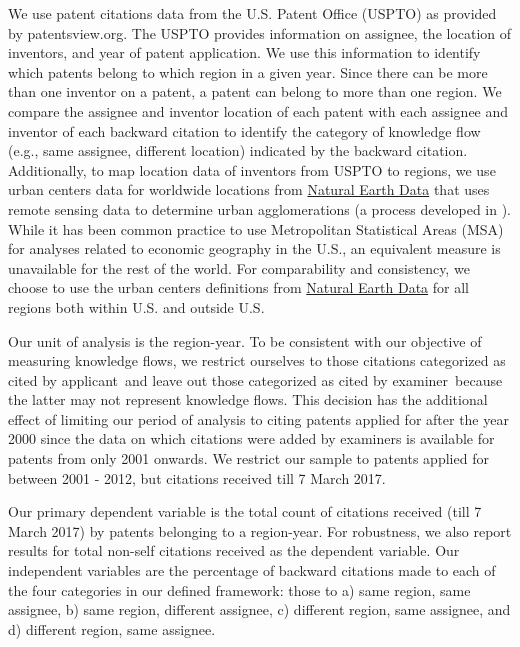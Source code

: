 \documentclass[parskip=full,11pt,letterpaper]{article}
\begin{document}
We use patent citations data from the U.S. Patent Office (USPTO) as provided by patentsview.org. The USPTO provides information on assignee, the location of inventors, and year of patent application. We use this information to identify which patents belong to which region in a given year. Since there can be more than one inventor on a patent, a patent can belong to more than one region. We compare the assignee and inventor location of each patent with each assignee and inventor of each backward citation  to identify the category of knowledge flow (e.g., same assignee, different location) indicated by the backward citation. Additionally, to map location data of inventors from USPTO to regions, we use urban centers data for worldwide locations from \href{http://www.naturalearthdata.com/downloads/10m-cultural-vectors/}{Natural Earth Data} that uses remote sensing data to determine urban agglomerations (a process developed in \citet*{Schneider2003}).  While it has been common practice to use Metropolitan Statistical Areas (MSA) for analyses related to economic geography in the U.S., an equivalent measure is unavailable for the rest of the world. For comparability and consistency, we choose to use the urban centers definitions from \href{http://www.naturalearthdata.com/downloads/10m-cultural-vectors/}{Natural Earth Data} for all regions both within U.S. and outside U.S. \par
Our unit of analysis is the region-year. To be consistent with our objective of measuring knowledge flows, we restrict ourselves to those citations categorized as \textquotesingle cited by applicant\textquotesingle \ and leave out those categorized as \textquotesingle cited by examiner\textquotesingle \ because the latter may not represent knowledge flows. This decision has the additional effect of limiting our period of analysis to citing patents applied for after the year 2000 since the data on which citations were added by examiners is available for patents from only 2001 onwards. We restrict our sample to patents applied for between 2001 - 2012, but citations received till 7 March 2017. \par
Our primary dependent variable is the  total count of citations received (till 7 March 2017) by patents belonging to a region-year. For robustness, we also report results for total non-self citations received as the dependent variable. Our independent variables are the percentage of backward citations made to each of the four categories in our defined framework: those to a) same region, same assignee, b) same region, different assignee, c) different region, same assignee, and d) different region, same assignee. \par
\end{document}
